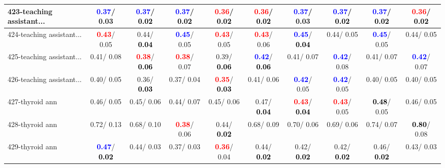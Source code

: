 \begin{table}[h]
\begin{center}
{\begin{tabular}{lc|c|c|c|c|c|c|c|c}
423-teaching assistant... & \textcolor{blue}{\textbf{  0.37}}/  0.03 & \textcolor{blue}{\textbf{  0.37}}/\textcolor{black}{\textbf{  0.02}} & \textcolor{blue}{\textbf{  0.37}}/\textcolor{black}{\textbf{  0.02}} & \textcolor{red}{\textbf{  0.36}}/\textcolor{black}{\textbf{  0.02}} & \textcolor{red}{\textbf{  0.36}}/\textcolor{black}{\textbf{  0.02}} & \textcolor{blue}{\textbf{  0.37}}/  0.03 & \textcolor{blue}{\textbf{  0.37}}/\textcolor{black}{\textbf{  0.02}} & \textcolor{blue}{\textbf{  0.37}}/\textcolor{black}{\textbf{  0.02}} & \textcolor{red}{\textbf{  0.36}}/\textcolor{black}{\textbf{  0.02}} \\ \hline
424-teaching assistant... & \textcolor{red}{\textbf{  0.43}}/  0.05 &   0.44/\textcolor{black}{\textbf{  0.04}} & \textcolor{blue}{\textbf{  0.45}}/  0.05 & \textcolor{red}{\textbf{  0.43}}/  0.05 & \textcolor{red}{\textbf{  0.43}}/  0.06 & \textcolor{blue}{\textbf{  0.45}}/\textcolor{black}{\textbf{  0.04}} &   0.44/  0.05 & \textcolor{blue}{\textbf{  0.45}}/  0.05 &   0.44/  0.05 \\
425-teaching assistant... &   0.41/  0.08 & \textcolor{red}{\textbf{  0.38}}/\textcolor{black}{\textbf{  0.06}} & \textcolor{red}{\textbf{  0.38}}/  0.07 &   0.39/\textcolor{black}{\textbf{  0.06}} & \textcolor{blue}{\textbf{  0.42}}/\textcolor{black}{\textbf{  0.06}} &   0.41/  0.07 & \textcolor{blue}{\textbf{  0.42}}/  0.08 &   0.41/  0.07 & \textcolor{blue}{\textbf{  0.42}}/  0.07 \\
426-teaching assistant... &   0.40/  0.05 &   0.36/\textcolor{black}{\textbf{  0.03}} &   0.37/  0.04 & \textcolor{red}{\textbf{  0.35}}/\textcolor{black}{\textbf{  0.03}} &   0.41/  0.06 & \textcolor{blue}{\textbf{  0.42}}/  0.05 & \textcolor{blue}{\textbf{  0.42}}/  0.05 &   0.40/  0.05 &   0.40/  0.05 \\
427-thyroid ann &   0.46/  0.05 &   0.45/  0.06 &   0.44/  0.07 &   0.45/  0.06 &   0.47/\textcolor{black}{\textbf{  0.04}} & \textcolor{red}{\textbf{  0.43}}/\textcolor{black}{\textbf{  0.04}} & \textcolor{red}{\textbf{  0.43}}/  0.05 & \textcolor{black}{\textbf{  0.48}}/  0.05 &   0.46/  0.05 \\
428-thyroid ann &   0.72/  0.13 &   0.68/  0.10 & \textcolor{red}{\textbf{  0.38}}/  0.06 &   0.44/\textcolor{black}{\textbf{  0.02}} &   0.68/  0.09 &   0.70/  0.06 &   0.69/  0.06 &   0.74/  0.07 & \textcolor{black}{\textbf{  0.80}}/  0.08 \\
429-thyroid ann & \textcolor{blue}{\textbf{  0.47}}/\textcolor{black}{\textbf{  0.02}} &   0.44/  0.03 &   0.37/  0.03 & \textcolor{red}{\textbf{  0.36}}/  0.04 &   0.44/\textcolor{black}{\textbf{  0.02}} &   0.42/\textcolor{black}{\textbf{  0.02}} &   0.42/\textcolor{black}{\textbf{  0.02}} &   0.46/\textcolor{black}{\textbf{  0.02}} &   0.43/  0.03 \\

\end{tabular}}
\end{center}
\end{table}
